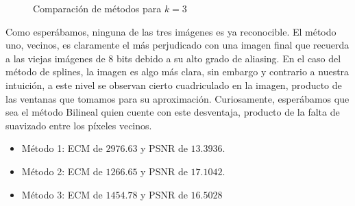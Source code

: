 \begin{figure}[H]
    \centering
    \qquad
    \qquad
    \caption{Comparación de métodos para $k = 3$}%
    \label{fig:example}%
\end{figure}

Como esperábamos, ninguna de las tres imágenes es ya reconocible. El método uno, vecinos, es claramente el más perjudicado con una imagen final que recuerda a las viejas imágenes de 8 bits debido a su alto grado de aliasing. En el caso del método de splines, la imagen es algo más clara, sin embargo y contrario a nuestra intuición, a este nivel se observan cierto cuadriculado en la imagen, producto de las ventanas que tomamos para su aproximación. Curiosamente, esperábamos que sea el método Bilineal quien cuente con este desventaja, producto de la falta de suavizado entre los píxeles vecinos.
\begin{itemize}
 \item Método 1: ECM de $2976.63$ y PSNR de $13.3936$.
 \item Método 2: ECM de $1266.65$ y PSNR de $17.1042$.
 \item Método 3: ECM de $1454.78$ y PSNR de $16.5028$
\end{itemize}

